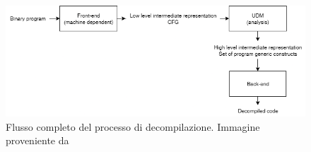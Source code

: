 \documentclass[../main.tex]{subfiles}
\begin{document}
\begin{figure}[H]
    \centering
    \includegraphics[width = 0.90\linewidth]{../images/Decompilation.png}
    \caption{Flusso completo del processo di decompilazione. Immagine proveniente da \cite{Cifuentes1995DecompilationOB}}
\end{figure}
\end{document}
